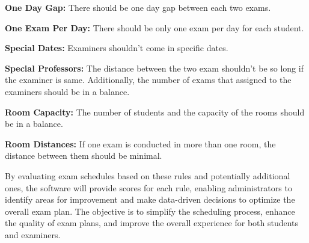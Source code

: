     \textbf{One Day Gap:} \vspace{\baselineskip}
    There should be one day gap between each two exams.
    
    \textbf{One Exam Per Day:} \vspace{\baselineskip}
    There should be only one exam per day for each student.
    
    \textbf{Special Dates:} \vspace{\baselineskip}
    Examiners shouldn't come in specific dates.
    
    \textbf{Special Professors:} \vspace{\baselineskip}
    The distance between the two exam shouldn't be so long if the examiner is same. Additionally, the number of exams that assigned to the examiners should be in a balance.
    
    
    \textbf{Room Capacity:}\vspace{\baselineskip}
    The number of students and the capacity of the rooms should be in a balance.
    
    \textbf{Room Distances:} 
    If one exam is conducted in more than one room, the distance between them should be minimal.

         
 
\vspace{\baselineskip}
    

By evaluating exam schedules based on these rules and potentially additional ones, the software will provide scores for each rule, enabling administrators to identify areas for improvement and make data-driven decisions to optimize the overall exam plan. The objective is to simplify the scheduling process, enhance the quality of exam plans, and improve the overall experience for both students and examiners.

\vspace{\baselineskip}
